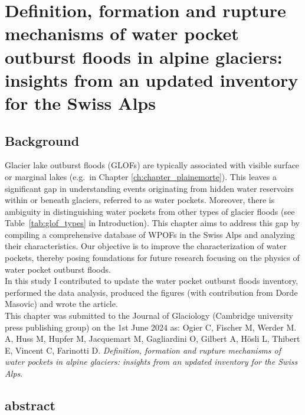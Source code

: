 \chapter{Definition, formation and rupture mechanisms of water pocket outburst floods in alpine glaciers: insights from an updated inventory for the Swiss Alps}
\label{ch:chapter_WPOFs}

\section{Background}

Glacier lake outburst floods (GLOFs) are typically associated with visible surface or marginal lakes (e.g.\ in Chapter \ref{ch:chapter_plainemorte}). This leaves a significant gap in understanding events originating from hidden water reservoirs within or beneath glaciers, referred to as water pockets. Moreover, there is ambiguity in distinguishing water pockets from other types of glacier floods (see Table~\ref{tab:glof_types} in Introduction). This chapter aims to address this gap by compiling a comprehensive database of WPOFs in the Swiss Alps and analyzing their characteristics. Our objective is to improve the characterization of water pockets, thereby posing foundations for future research focusing on the physics of water pocket outburst floods.\\
%
In this study I contributed to update the water pocket outburst floods inventory, performed the data analysis, produced the figures (with contribution from Dorde Masovic) and wrote the article. \\
%
This chapter was submitted to the Journal of Glaciology (Cambridge university press publishing
group) on the 1st June 2024 as: Ogier C, Fischer M, Werder M. A, Huss M, Hupfer M, Jacquemart M, Gagliardini O, Gilbert A, Hösli L, Thibert E, Vincent C, Farinotti D. \textit{Definition, formation and rupture mechanisms of water pockets in alpine glaciers: insights from an updated inventory for the Swiss Alps}. \\

\clearpage

\section{abstract}

